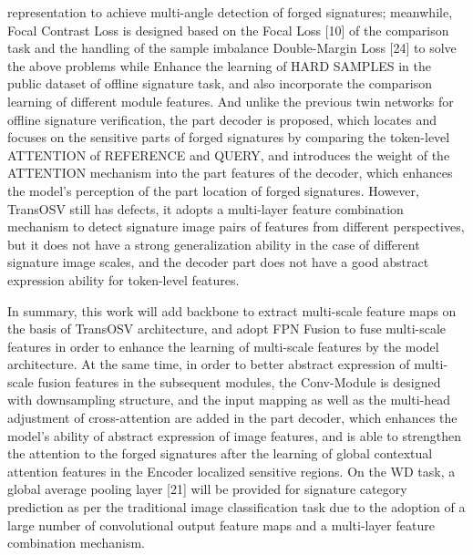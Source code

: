 representation to achieve multi-angle detection of forged signatures; meanwhile, Focal Contrast Loss is designed based on the Focal Loss [10] of the comparison task and the handling of the sample imbalance Double-Margin Loss [24] to solve the above problems while Enhance the learning of HARD SAMPLES in the public dataset of offline signature task, and also incorporate the comparison learning of different module features. And unlike the previous twin networks for offline signature verification, the part decoder is proposed, which locates and focuses on the sensitive parts of forged signatures by comparing the token-level ATTENTION of REFERENCE and QUERY, and introduces the weight of the ATTENTION mechanism into the part features of the decoder, which enhances the model's perception of the part location of forged signatures. However, TransOSV still has defects, it adopts a multi-layer feature combination mechanism to detect signature image pairs of features from different perspectives, but it does not have a strong generalization ability in the case of different signature image scales, and the decoder part does not have a good abstract expression ability for token-level features.

In summary, this work will add backbone to extract multi-scale feature maps on the basis of TransOSV architecture, and adopt FPN Fusion to fuse multi-scale features in order to enhance the learning of multi-scale features by the model architecture. At the same time, in order to better abstract expression of multi-scale fusion features in the subsequent modules, the Conv-Module is designed with downsampling structure, and the input mapping as well as the multi-head adjustment of cross-attention are added in the part decoder, which enhances the model's ability of abstract expression of image features, and is able to strengthen the attention to the forged signatures after the learning of global contextual attention features in the Encoder localized sensitive regions. On the WD task, a global average pooling layer [21] will be provided for signature category prediction as per the traditional image classification task due to the adoption of a large number of convolutional output feature maps and a multi-layer feature combination mechanism.



